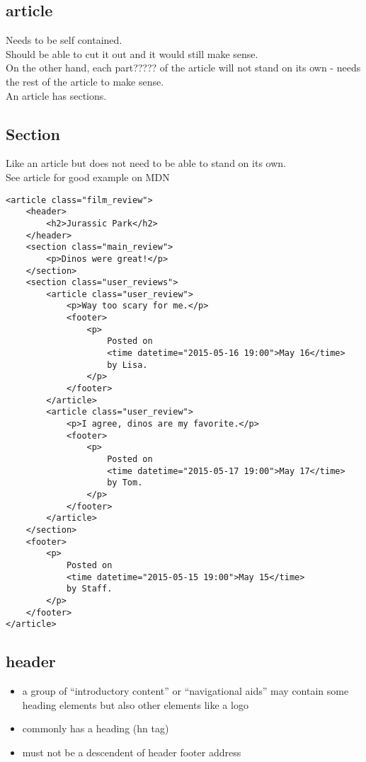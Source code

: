 \documentclass[]{article}
\begin{document}
\subsection{article}
Needs to be self contained.  
\\
Should be able to cut it out and it would still make sense.
\\
On the other hand, each part????? of the article will not stand on its own - needs the rest of the article to make sense.
\\
An article has sections.

\subsection{Section}
Like an article but does not need to be able to stand on its own.
\\
See article for good example on MDN
\begin{lstlisting}
<article class="film_review">
	<header>
		<h2>Jurassic Park</h2>
	</header>
	<section class="main_review">
		<p>Dinos were great!</p>
	</section>
	<section class="user_reviews">
		<article class="user_review">
			<p>Way too scary for me.</p>
			<footer>
				<p>
					Posted on
					<time datetime="2015-05-16 19:00">May 16</time>
					by Lisa.
				</p>
			</footer>
		</article>
		<article class="user_review">
			<p>I agree, dinos are my favorite.</p>
			<footer>
				<p>
					Posted on
					<time datetime="2015-05-17 19:00">May 17</time>
					by Tom.
				</p>
			</footer>
		</article>
	</section>
	<footer>
		<p>
			Posted on
			<time datetime="2015-05-15 19:00">May 15</time>
			by Staff.
		</p>
	</footer>
</article>
\end{lstlisting}

\subsection{header}
\begin{itemize}
	\item a group of “introductory content” or “navigational aids”
	\subitem may contain some heading elements but also other elements like a logo
	
	\item commonly has a heading (hn tag)
	
	\item must not be a descendent of 
	\subitem header
	\subitem footer
	\subitem address
\end{itemize}
\end{document}
